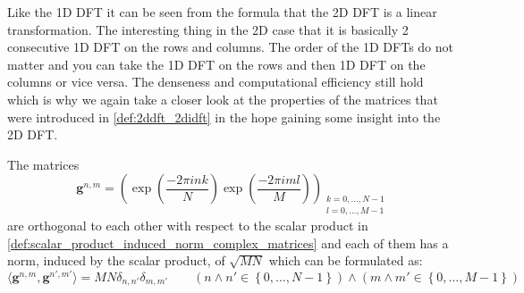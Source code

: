 \begin{Rem}
Like the 1D \ac{DFT} it can be seen from the formula that the 2D \ac{DFT} is a linear transformation. 
The interesting thing in the 2D case that it is basically 2 consecutive 1D \ac{DFT} on the rows and columns. 
The order of the 1D \ac{DFT}s do not matter and you can take the 1D \ac{DFT} on the rows and then 1D 
\ac{DFT} on the columns or vice versa. The denseness and computational efficiency still hold which is why 
we again take a closer look at the properties of the matrices that were introduced in \cref{def:2ddft_2didft} in the hope gaining
some insight into the 2D {DFT}.
\end{Rem}

\begin{Prop}\label{Prop:2ddft_matrices_orthogonality}
    The matrices
    \begin{equation}\label{eq:2ddft_matrices}
        \boldsymbol{g}^{n,m} = \left(\exp\left({\frac{-2\pi ink}{N}}\right)\exp\left({\frac{-2\pi iml}{M}}\right)\right)_{\substack{k=0,\ldots,N-1\\l=0,\ldots,M-1}}
    \end{equation}
    are orthogonal to each other with respect to the scalar product in \cref{def:scalar_product_induced_norm_complex_matrices} and 
    each of them has a norm, induced by the scalar product, of $\sqrt{MN}$ which can be formulated as:
    \begin{equation}
        \langle\boldsymbol{g}^{n,m},\boldsymbol{g}^{n',m'}\rangle= MN \delta_{n,n'}\delta_{m,m'} \qquad (n \land n' \in \left\{0,\ldots,N-1\right\}) \land (m \land m' \in \left\{0,\ldots,M-1\right\})
    \end{equation}
\end{Prop}

